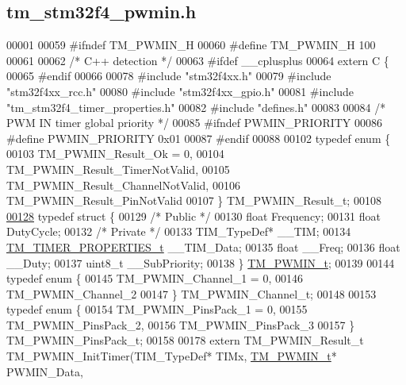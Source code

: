 \hypertarget{tm__stm32f4__pwmin_8h_source}{}\subsection{tm\+\_\+stm32f4\+\_\+pwmin.\+h}

\begin{DoxyCode}
00001 
00059 \textcolor{preprocessor}{#ifndef TM\_PWMIN\_H}
00060 \textcolor{preprocessor}{#define TM\_PWMIN\_H 100}
00061 
00062 \textcolor{comment}{/* C++ detection */}
00063 \textcolor{preprocessor}{#ifdef \_\_cplusplus}
00064 \textcolor{keyword}{extern} C \{
00065 \textcolor{preprocessor}{#endif}
00066 
00078 \textcolor{preprocessor}{#include "stm32f4xx.h"}
00079 \textcolor{preprocessor}{#include "stm32f4xx\_rcc.h"}
00080 \textcolor{preprocessor}{#include "stm32f4xx\_gpio.h"}
00081 \textcolor{preprocessor}{#include "tm\_stm32f4\_timer\_properties.h"}
00082 \textcolor{preprocessor}{#include "defines.h"}
00083 
00084 \textcolor{comment}{/* PWM IN timer global priority */}
00085 \textcolor{preprocessor}{#ifndef PWMIN\_PRIORITY}
00086 \textcolor{preprocessor}{#define PWMIN\_PRIORITY      0x01}
00087 \textcolor{preprocessor}{#endif}
00088 
00102 \textcolor{keyword}{typedef} \textcolor{keyword}{enum} \{
00103     TM\_PWMIN\_Result\_Ok = 0,
00104     TM\_PWMIN\_Result\_TimerNotValid,
00105     TM\_PWMIN\_Result\_ChannelNotValid,
00106     TM\_PWMIN\_Result\_PinNotValid
00107 \} TM\_PWMIN\_Result\_t;
00108 
\hypertarget{tm__stm32f4__pwmin_8h_source_l00128}{}\hyperlink{struct_t_m___p_w_m_i_n__t}{00128} \textcolor{keyword}{typedef} \textcolor{keyword}{struct }\{
00129     \textcolor{comment}{/* Public */}
00130     \textcolor{keywordtype}{float} Frequency;
00131     \textcolor{keywordtype}{float} DutyCycle;
00132     \textcolor{comment}{/* Private */}
00133     TIM\_TypeDef* \_\_TIM;
00134     \hyperlink{struct_t_m___t_i_m_e_r___p_r_o_p_e_r_t_i_e_s__t}{TM\_TIMER\_PROPERTIES\_t} \_\_TIM\_Data;
00135     \textcolor{keywordtype}{float} \_\_Freq;
00136     \textcolor{keywordtype}{float} \_\_Duty;
00137     uint8\_t \_\_SubPriority;
00138 \} \hyperlink{struct_t_m___p_w_m_i_n__t}{TM\_PWMIN\_t};
00139 
00144 \textcolor{keyword}{typedef} \textcolor{keyword}{enum} \{
00145     TM\_PWMIN\_Channel\_1 = 0,
00146     TM\_PWMIN\_Channel\_2
00147 \} TM\_PWMIN\_Channel\_t;
00148 
00153 \textcolor{keyword}{typedef} \textcolor{keyword}{enum} \{
00154     TM\_PWMIN\_PinsPack\_1 = 0,
00155     TM\_PWMIN\_PinsPack\_2,
00156     TM\_PWMIN\_PinsPack\_3
00157 \} TM\_PWMIN\_PinsPack\_t;
00158 
00178 \textcolor{keyword}{extern} TM\_PWMIN\_Result\_t TM\_PWMIN\_InitTimer(TIM\_TypeDef* TIMx, \hyperlink{struct_t_m___p_w_m_i_n__t}{TM\_PWMIN\_t}* PWMIN\_Data, 

\end{DoxyCode}
